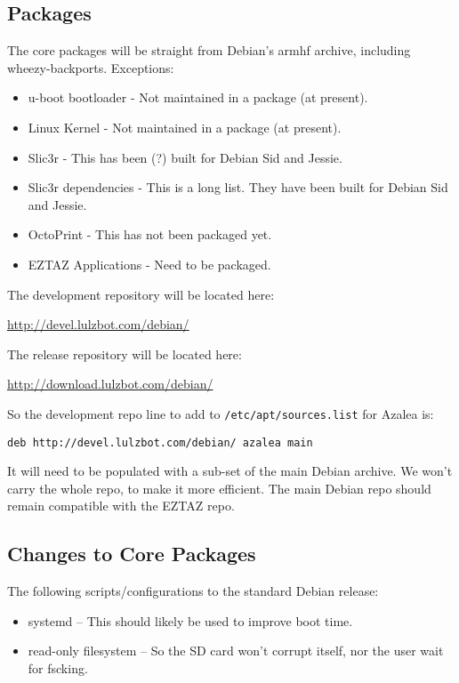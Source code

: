 \subsection{Packages}
The core packages will be straight from Debian's armhf archive, including
wheezy-backports. Exceptions:

\begin{itemize}
  \item{u-boot bootloader} - Not maintained in a package (at present).
  \item{Linux Kernel} - Not maintained in a package (at present).
  \item{Slic3r} - This has been (?) built for Debian Sid and Jessie.
  \item{Slic3r dependencies} - This is a long list. They have been built for
  Debian Sid and Jessie.
  \item{OctoPrint} - This has not been packaged yet.
  \item{EZTAZ Applications} - Need to be packaged.
\end{itemize}

The development repository will be located here:

\url{http://devel.lulzbot.com/debian/}

The release repository will be located here:

\url{http://download.lulzbot.com/debian/}

So the development repo line to add to \verb|/etc/apt/sources.list|
for Azalea is:

\verb|deb http://devel.lulzbot.com/debian/ azalea main|


It will need to be populated with a sub-set of the main Debian archive. We
won't carry the whole repo, to make it more efficient. The main Debian repo
should remain compatible with the EZTAZ repo.


\subsection{Changes to Core Packages}
The following scripts/configurations to the standard Debian release:

\begin{itemize}
  \item{systemd} -- This should likely be used to improve boot time.
  \item{read-only filesystem} -- So the SD card won't corrupt itself, nor the
  user wait for fscking.
\end{itemize}


